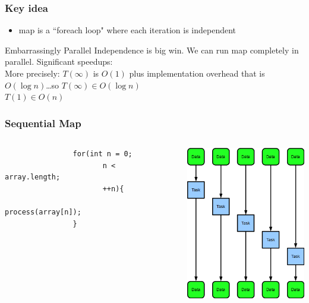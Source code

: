 \documentclass[xcolor=dvipsnames]{beamer}
\begin{document}
	\begin{frame} \frametitle{Key idea}
		\begin{itemize}
			\item map is a ``foreach loop" \pause 
			\alert{where each iteration is independent} \pause
		\end{itemize}
		\begin{block}{Embarrassingly Parallel}
		Independence is big win.  We can run map completely in parallel.
		Significant speedups:\\More precisely: $T(\infty)$ is  $O(1)$ plus
		implementation overhead that is $O(\log{n})$\ldots so $T(\infty)
		\in O(\log n)$\\$T(1) \in O(n)$
		\end{block}
	\end{frame}
		
	\begin{frame}[fragile] \frametitle{Sequential Map}
		\begin{columns}
			\begin{column}{0.5\textwidth}
				\begin{verbatim}
				for(int n = 0;
					   n < array.length;
					   ++n){
					        process(array[n]);
				}
				\end{verbatim}
		    \end{column}
  			\begin{column}{0.5\textwidth}
				\includegraphics[width=60mm]{images/map_serial.png}
		    \end{column}
		\end{columns}
	\end{frame}
		
\end{document}
